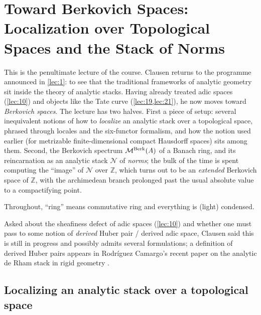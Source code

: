 \section{Toward Berkovich Spaces: Localization over
Topological Spaces and the Stack of Norms}
\label{lec:22}

This is the penultimate lecture of the course. Clausen returns to the
programme announced in \cref{lec:1}: to see that the traditional frameworks of
analytic geometry sit inside the theory of analytic stacks. Having already
treated adic spaces (\cref{lec:10}) and objects like the Tate curve
(\cref{lec:19,lec:21}), he now moves toward \emph{Berkovich spaces}. The
lecture has two halves. First a piece of setup: several inequivalent notions of
how to \emph{localize} an analytic stack over a topological space, phrased
through locales and the six-functor formalism, and how the notion used earlier
(for metrizable finite-dimensional compact Hausdorff spaces) sits among them.
Second, the Berkovich spectrum $\mathcal{M}^{\mathrm{Berk}}(A)$ of a Banach ring, and its
reincarnation as an analytic stack $\mathcal N$ of \emph{norms}; the bulk of the
time is spent computing the ``image'' of $\mathcal N$ over $\mathbb Z$, which
turns out to be an \emph{extended} Berkovich space of $\mathbb Z$, with the
archimedean branch prolonged past the usual absolute value to a compactifying
point.

Throughout, ``ring'' means commutative ring and everything is (light)
condensed.

\begin{remark}
\label{rmk:22:derived-huber}
Asked about the sheafiness defect of adic spaces (\cref{lec:10}) and whether one
must pass to some notion of \emph{derived} Huber pair / derived adic space,
Clausen said this is still in progress and possibly admits several
formulations; a definition of derived Huber pairs appears in Rodr\'iguez
Camargo's recent paper on the analytic de Rham stack in rigid geometry
\cite{camargo2024analyticrhamstackrigid}.
\end{remark}

\subsection{Localizing an analytic stack over a topological space}
\label{subsec:22:localization}

